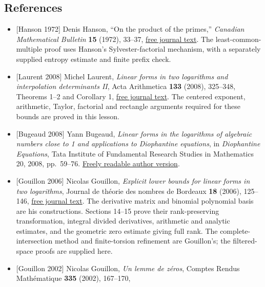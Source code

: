 \documentclass[
  11pt,
  a4paper,
]{article}
\begin{document}
\subsection{References}\label{references}

\begin{itemize}
\item
  {[}Hanson 1972{]} Denis Hanson, ``On the product of the primes,''
  \emph{Canadian Mathematical Bulletin} \textbf{15} (1972), 33--37,
  \href{https://www.cambridge.org/core/services/aop-cambridge-core/content/view/EBCBB4096EBC2A145C743C4C0E123E69/S0008439500060835a.pdf/on_the_product_of_the_primes.pdf}{free
  journal text}. The least-common-multiple proof uses Hanson's
  Sylvester-factorial mechanism, with a separately supplied entropy
  estimate and finite prefix check.
\item
  {[}Laurent 2008{]} Michel Laurent, \emph{Linear forms in two
  logarithms and interpolation determinants II}, Acta Arithmetica
  \textbf{133} (2008), 325--348, Theorems 1--2 and Corollary 1,
  \href{https://www.impan.pl/shop/publication/transaction/download/product/82485}{free
  journal text}. The centered exponent, arithmetic, Taylor, factorial
  and rectangle arguments required for these bounds are proved in this
  lesson.
\item
  {[}Bugeaud 2008{]} Yann Bugeaud, \emph{Linear forms in the logarithms
  of algebraic numbers close to 1 and applications to Diophantine
  equations}, in \emph{Diophantine Equations}, Tata Institute of
  Fundamental Research Studies in Mathematics 20, 2008, pp.~59--76.
  \href{https://irma.math.unistra.fr/~bugeaud/travaux/ConfMumbaidef.pdf}{Freely
  readable author version}.
\item
  {[}Gouillon 2006{]} Nicolas Gouillon, \emph{Explicit lower bounds for
  linear forms in two logarithms}, Journal de théorie des nombres de
  Bordeaux \textbf{18} (2006), 125--146,
  \href{https://jtnb.centre-mersenne.org/item/10.5802/jtnb.537.pdf}{free
  journal text}. The derivative matrix and binomial polynomial basis are
  his constructions. Sections 14--15 prove their rank-preserving
  transformation, integral divided derivatives, arithmetic and analytic
  estimates, and the geometric zero estimate giving full rank. The
  complete-intersection method and finite-torsion refinement are
  Gouillon's; the filtered-space proofs are supplied here.
\item
  {[}Gouillon 2002{]} Nicolas Gouillon, \emph{Un lemme de zéros},
  Comptes Rendus Mathématique \textbf{335} (2002), 167--170,

\end{itemize}
\end{document}
